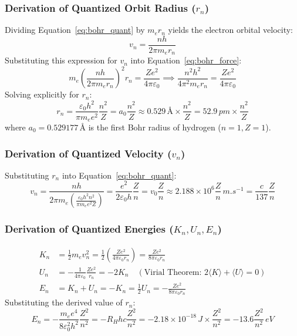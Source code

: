 \documentclass[10pt,twoside,openright]{book}
\begin{document}
\subsubsection{Derivation of Quantized Orbit Radius ($r_n$)}
Dividing Equation~\ref{eq:bohr_quant} by $m_e r_n$ yields the electron orbital velocity:
\begin{equation}
  v_n = \frac{n h}{2\pi m_e r_n}
\end{equation}
Substituting this expression for $v_n$ into Equation~\ref{eq:bohr_force}:
\begin{equation}
  m_e \left(\frac{n h}{2\pi m_e r_n}\right)^2 r_n = \frac{Z e^2}{4\pi\varepsilon_0} \implies \frac{n^2 h^2}{4\pi^2 m_e r_n} = \frac{Z e^2}{4\pi\varepsilon_0}
\end{equation}
Solving explicitly for $r_n$:
\begin{equation}
  r_n = \frac{\varepsilon_0 h^2}{\pi m_e e^2} \frac{n^2}{Z} = a_0 \frac{n^2}{Z} \approx 0.529\,\text{\AA} \times \frac{n^2}{Z} = 52.9\,\si{pm} \times \frac{n^2}{Z}
\end{equation}
where $a_0 = 0.529177\,\text{\AA}$ is the first Bohr radius of hydrogen ($n=1, Z=1$).

\subsubsection{Derivation of Quantized Velocity ($v_n$)}
Substituting $r_n$ into Equation~\ref{eq:bohr_quant}:
\begin{equation}
  v_n = \frac{n h}{2\pi m_e \left(\frac{\varepsilon_0 h^2 n^2}{\pi m_e e^2 Z}\right)} = \frac{e^2}{2\varepsilon_0 h}\frac{Z}{n} = v_0 \frac{Z}{n} \approx 2.188 \times 10^6 \frac{Z}{n}\,\si{m.s^{-1}} = \frac{c}{137}\frac{Z}{n}
\end{equation}

\subsubsection{Derivation of Quantized Energies ($K_n, U_n, E_n$)}
\begin{align}
  K_n &= \frac{1}{2}m_e v_n^2 = \frac{1}{2}\left(\frac{Z e^2}{4\pi\varepsilon_0 r_n}\right) = \frac{Z e^2}{8\pi\varepsilon_0 r_n} \\
  U_n &= -\frac{1}{4\pi\varepsilon_0}\frac{Z e^2}{r_n} = -2 K_n \quad (\text{Virial Theorem: } 2\langle K \rangle + \langle U \rangle = 0) \\
  E_n &= K_n + U_n = -K_n = \frac{1}{2}U_n = -\frac{Z e^2}{8\pi\varepsilon_0 r_n}
\end{align}
Substituting the derived value of $r_n$:
\begin{equation}
  E_n = -\frac{m_e e^4}{8\varepsilon_0^2 h^2}\frac{Z^2}{n^2} = -R_H h c \frac{Z^2}{n^2} = -2.18 \times 10^{-18}\,\si{J} \times \frac{Z^2}{n^2} = -13.6 \frac{Z^2}{n^2}\,\si{eV}
\end{equation}
\end{document}
